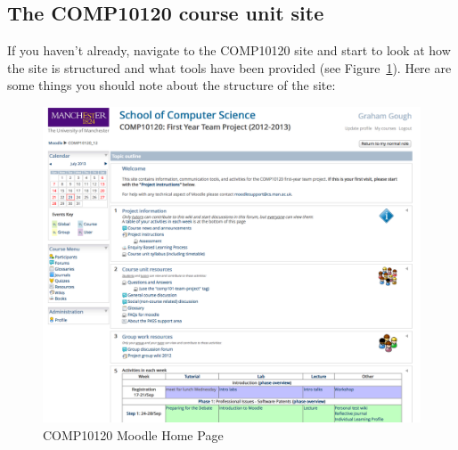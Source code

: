\subsection{The COMP10120 course unit site}
\label{sec:comp10120-course-uni}


If you haven't already, navigate to the COMP10120 site and start to look at how the site is structured and what tools have been provided (see Figure~\ref{figure:101-moodle-page}).
Here are some things you should note about the structure of the site:

\begin{figure}
\centerline{\includegraphics[width=15cm]{images/101-moodle-page}}
\caption{COMP10120 Moodle Home Page}\label{figure:101-moodle-page}
\end{figure}


